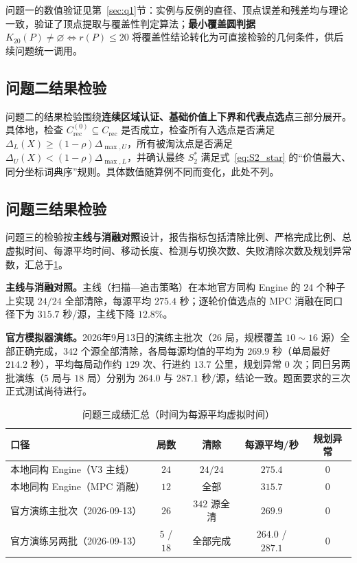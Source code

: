 \documentclass[withoutpreface]{cumcmthesis}
\begin{document}
问题一的数值验证见第~\cref{sec:q1}节：实例与反例的直径、顶点误差和残差均与理论一致，验证了顶点提取与覆盖性判定算法；\textbf{最小覆盖圆判据} $K_{20}(P)\neq\varnothing\iff r(P)\leq20$ 将覆盖性结论转化为可直接检验的几何条件，供后续问题统一调用。

\subsection{问题二结果检验}\label{sec:q2_verify}

问题二的结果检验围绕\textbf{连续区域认证、基础价值上下界和代表点选点}三部分展开。具体地，检查 $C_{\mathrm{rec}}^{(0)}\subseteq C_{\mathrm{rec}}$ 是否成立，检查所有入选点是否满足 $\Delta_L(X)\ge(1-\rho)\Delta_{\max,U}$，所有被淘汰点是否满足 $\Delta_U(X)<(1-\rho)\Delta_{\max,L}$，并确认最终 $S_2^*$ 满足式~\eqref{eq:S2_star} 的“价值最大、同分坐标词典序”规则。具体数值随算例不同而变化，此处不列。

\subsection{问题三结果检验}\label{sec:q3_verify}

问题三的检验按\textbf{主线与消融对照}设计，报告指标包括清除比例、严格完成比例、总虚拟时间、每源平均时间、移动长度、检测与切换次数、失败清除次数及规划异常数，汇总于\cref{tab:q3_results}。

\textbf{主线与消融对照。}主线（扫描—追击策略）在本地官方同构 Engine 的 $24$ 个种子上实现 $24/24$ 全部清除，每源平均 $275.4$ 秒；逐轮价值选点的 MPC 消融在同口径下为 $315.7$ 秒/源，主线下降 $12.8\%$。

\textbf{官方模拟器演练。}2026年9月13日的演练主批次（$26$ 局，规模覆盖 $10\sim16$ 源）全部正确完成，$342$ 个源全部清除，各局每源均值的平均为 $269.9$ 秒（单局最好 $214.2$ 秒），平均每局动作约 $129$ 次、行进约 $13.7$ 公里，规划异常 $0$ 次；同日另两批演练（$5$ 局与 $18$ 局）分别为 $264.0$ 与 $287.1$ 秒/源，结论一致。题面要求的三次正式测试尚待进行。

\begin{table}[!htb]
\centering
\caption{问题三成绩汇总（时间为每源平均虚拟时间）}\label{tab:q3_results}
\begin{tabular}{lcccc}
\toprule
口径 & 局数 & 清除 & 每源平均/秒 & 规划异常 \\
\midrule
本地同构 Engine（V3 主线） & $24$ & $24/24$ & $275.4$ & $0$ \\
本地同构 Engine（MPC 消融） & $12$ & 全部 & $315.7$ & $0$ \\
官方演练主批次（2026-09-13） & $26$ & $342$ 源全清 & $269.9$ & $0$ \\
官方演练另两批（2026-09-13） & $5$ / $18$ & 全部完成 & $264.0$ / $287.1$ & $0$ \\
\bottomrule
\end{tabular}
\end{table}
\end{document}
